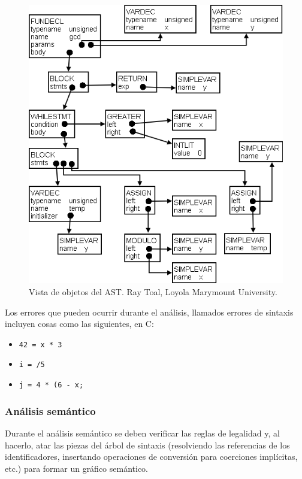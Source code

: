\begin{figure}[ht]
    \centering
    \includegraphics[scale=0.3]{images/gcdast2.png}
    \caption{Vista de objetos del AST. Ray Toal, Loyola Marymount University.}
    \label{fig:ast objects}
\end{figure}

Los errores que pueden ocurrir durante el análisis, llamados errores de sintaxis incluyen cosas como las siguientes, en C:

\begin{itemize}
    \item \texttt{42 = x * 3}
    \item \texttt{i = /5}
    \item \texttt{j = 4 * (6 - x;}
\end{itemize}


\subsubsection{Análisis semántico}
Durante el análisis semántico se deben verificar las reglas de legalidad y, al hacerlo, atar las piezas del árbol de sintaxis (resolviendo las referencias de los identificadores, insertando operaciones de conversión para coerciones implícitas, etc.) para formar un gráfico semántico.\\

